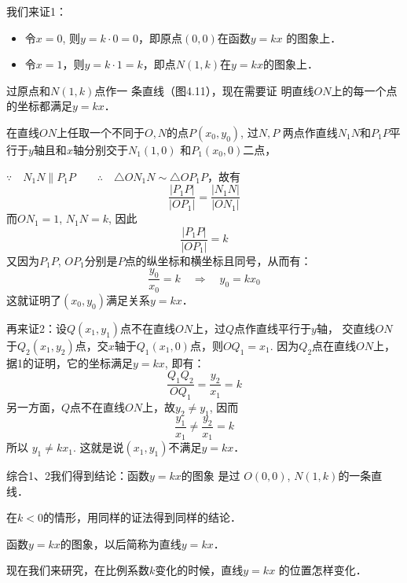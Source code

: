 我们来证1：
\begin{itemize}
    \item 令$x=0$, 则$y=k\cdot 0=0$，即原点$(0,0)$在函数$y=kx$
的图象上．
\item 令$x=1$，则$y=k\cdot 1=k$，即点$N(1,k)$在$y=kx$的图象上．
\end{itemize}

过原点和$N(1,k)$点作一
条直线（图4.11），现在需要证
明直线$ON$上的每一个点的坐标都满足$y=kx$．

\begin{figure}[htp]
    \centering
{}
    \caption{}
\end{figure}

在直线$ON$上任取一个不同于$O,N$的点$P(x_0,y_0)$, 过$N,P$
两点作直线$N_1N$和$P_1P$平行于$y$轴且和$x$轴分别交于$N_1(1,0)$
和$P_1(x_0,0)$二点，

$\because\quad N_1N\parallel P_1P\qquad \therefore\quad \triangle ON_1N\sim \triangle OP_1P$，故有
\[\frac{|P_1P|}{|OP_1|}=\frac{|N_1N|}{|ON_1|}\]
而$ON_1=1$, $N_1N=k$, 因此
\[\frac{|P_1P|}{|OP_1|}=k\]
又因为$P_1P$, $OP_1$分别是$P$点的纵坐标和横坐标且同号，从而有：
\[\frac{y_0}{x_0}=k\quad \Rightarrow\quad y_0=kx_0\]
这就证明了$(x_0,y_0)$满足关系$y=kx$．

再来证2：设$Q(x_1,y_1)$点不在直线$ON$上，过$Q$点作直线平行于$y$轴，
交直线$ON$于$Q_2(x_1,y_2)$点，交$x$轴于$Q_1(x_1,0)$点，则$OQ_1=
x_1$. 因为$Q_2$点在直线$ON$上，据1的证明，它的坐标满足$y=
kx$, 即有：
\[\frac{Q_1Q_2}{OQ_1}=\frac{y_2}{x_1}=k\]
另一方面，$Q$点不在直线$ON$上，故$y_2\ne y_1$, 因而
\[\frac{y_1}{x_1}\ne \frac{y_2}{x_1}=k\]
所以 $y_1\ne kx_1$. 这就是说$(x_1,y_1)$不满足$y=kx$．

综合1、2我们得到结论：函数$y=kx$的图象 是过
$O(0,0)$, $N(1,k)$的一条直线．

在$k<0$的情形，用同样的证法得到同样的结论．

函数$y=kx$的图象，以后简称为直线$y=kx$．

现在我们来研究，在比例系数$k$变化的时候，直线$y=kx$
的位置怎样变化．

